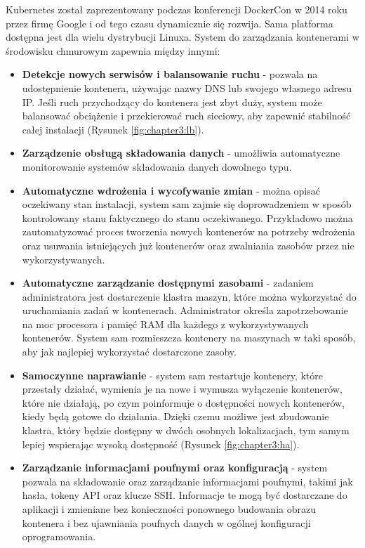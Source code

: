 \bigbreak
Kubernetes został zaprezentowany podczas konferencji DockerCon w 2014 roku przez firmę Google i od tego czasu dynamicznie się rozwija. Sama platforma dostępna jest dla wielu dystrybucji Linuxa. System do zarządzania kontenerami w środowisku chmurowym zapewnia między innymi:
\begin{itemize}
    \item \textbf{Detekcje nowych serwisów i balansowanie ruchu} - pozwala na udostępnienie kontenera, używając nazwy DNS lub swojego własnego adresu IP. Jeśli ruch przychodzący do kontenera jest zbyt duży, system może balansować obciążenie i przekierować ruch sieciowy, aby zapewnić stabilność całej instalacji (Rysunek \ref{fig:chapter3:lb}).
    \item \textbf{Zarządzenie obsługą składowania danych} - umożliwia automatyczne monitorowanie systemów składowania danych dowolnego typu.
    \item \textbf{Automatyczne wdrożenia i wycofywanie zmian} - można opisać oczekiwany stan instalacji, system sam zajmie się doprowadzeniem w sposób kontrolowany stanu faktycznego do stanu oczekiwanego. Przykładowo można zautomatyzować proces tworzenia nowych kontenerów na potrzeby wdrożenia oraz usuwania istniejących już kontenerów oraz zwalniania zasobów przez nie wykorzystywanych.
    \item \textbf{Automatyczne zarządzanie dostępnymi zasobami} - zadaniem administratora jest dostarczenie klastra maszyn, które można wykorzystać do uruchamiania zadań w kontenerach. Administrator określa zapotrzebowanie na moc procesora i pamięć RAM dla każdego z wykorzystywanych kontenerów. System sam rozmieszcza kontenery na maszynach w taki sposób, aby jak najlepiej wykorzystać dostarczone zasoby.
    \item \textbf{Samoczynne naprawianie} - system sam restartuje kontenery, które przestały działać, wymienia je na nowe i wymusza wyłączenie kontenerów, które nie działają, po czym poinformuje o dostępności nowych kontenerów, kiedy będą gotowe do działania. Dzięki czemu możliwe jest zbudowanie klastra, który będzie dostępny w dwóch osobnych lokalizacjach, tym samym lepiej wspierając wysoką dostępność (Rysunek \ref{fig:chapter3:ha}).
    \item \textbf{Zarządzanie informacjami poufnymi oraz konfiguracją} - system pozwala na składowanie oraz zarządzanie informacjami poufnymi, takimi jak hasła, tokeny API oraz klucze SSH. Informacje te mogą być dostarczane do aplikacji i zmieniane bez konieczności ponownego budowania obrazu kontenera i bez ujawniania poufnych danych w ogólnej konfiguracji oprogramowania.
\end{itemize}

